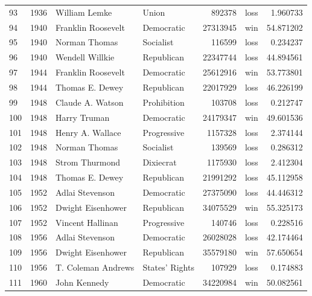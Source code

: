 \documentclass[
  letterpaper,
  DIV=11,
  numbers=noendperiod]{scrreprt}
\begin{document}
\begin{tabular}{lrllrlr}
93  &  1936 &           William Lemke &                  Union &        892378 &   loss &   1.960733 \\
94  &  1940 &      Franklin Roosevelt &             Democratic &      27313945 &    win &  54.871202 \\
95  &  1940 &           Norman Thomas &              Socialist &        116599 &   loss &   0.234237 \\
96  &  1940 &         Wendell Willkie &             Republican &      22347744 &   loss &  44.894561 \\
97  &  1944 &      Franklin Roosevelt &             Democratic &      25612916 &    win &  53.773801 \\
98  &  1944 &         Thomas E. Dewey &             Republican &      22017929 &   loss &  46.226199 \\
99  &  1948 &        Claude A. Watson &            Prohibition &        103708 &   loss &   0.212747 \\
100 &  1948 &            Harry Truman &             Democratic &      24179347 &    win &  49.601536 \\
101 &  1948 &        Henry A. Wallace &            Progressive &       1157328 &   loss &   2.374144 \\
102 &  1948 &           Norman Thomas &              Socialist &        139569 &   loss &   0.286312 \\
103 &  1948 &          Strom Thurmond &              Dixiecrat &       1175930 &   loss &   2.412304 \\
104 &  1948 &         Thomas E. Dewey &             Republican &      21991292 &   loss &  45.112958 \\
105 &  1952 &         Adlai Stevenson &             Democratic &      27375090 &   loss &  44.446312 \\
106 &  1952 &       Dwight Eisenhower &             Republican &      34075529 &    win &  55.325173 \\
107 &  1952 &        Vincent Hallinan &            Progressive &        140746 &   loss &   0.228516 \\
108 &  1956 &         Adlai Stevenson &             Democratic &      26028028 &   loss &  42.174464 \\
109 &  1956 &       Dwight Eisenhower &             Republican &      35579180 &    win &  57.650654 \\
110 &  1956 &      T. Coleman Andrews &         States' Rights &        107929 &   loss &   0.174883 \\
111 &  1960 &            John Kennedy &             Democratic &      34220984 &    win &  50.082561 \\

\end{tabular}
\end{document}
